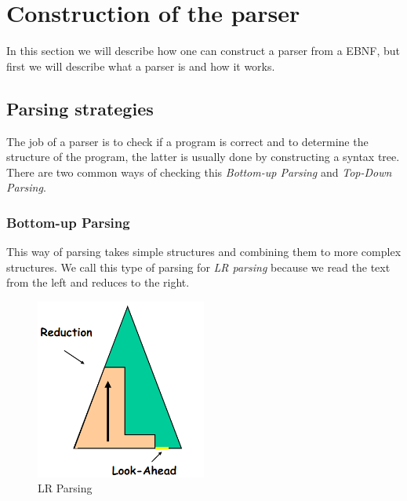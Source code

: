 \section{Construction of the parser}
	In this section we will describe how one can construct a parser from a EBNF, but first we will describe what a parser is and how it works.
	
	\subsection{Parsing strategies}
		The job of a parser is to check if a program is correct and 
		to determine the structure of the program, the latter is usually done by constructing a syntax tree.
		There are two common ways of checking this {\it Bottom-up Parsing} and {\it Top-Down Parsing}.
		
		\subsubsection*{Bottom-up Parsing}
			This way of parsing takes simple structures and combining them to more complex structures.
			We call this type of parsing for {\it LR parsing} because we read the text from the left and reduces to the right.
			\begin{figure}[H]
				\centering
				\includegraphics[width=0.5\textwidth]{rapport/2/figures/bottomup.png}
				\caption{LR Parsing}\label{fig:lrparse}
			\end{figure}
			
